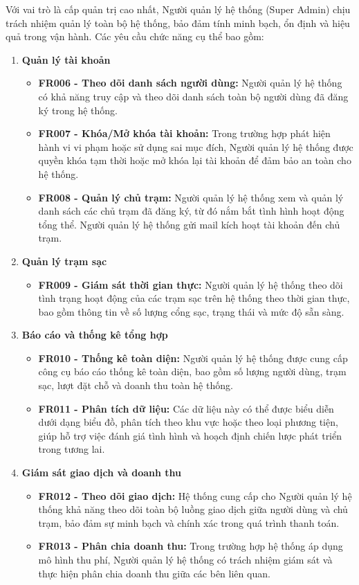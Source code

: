 Với vai trò là cấp quản trị cao nhất, Người quản lý hệ thống (Super Admin) chịu trách nhiệm quản lý toàn bộ hệ thống, bảo đảm tính minh bạch, ổn định và hiệu quả trong vận hành. Các yêu cầu chức năng cụ thể bao gồm:
\begin{enumerate}[label=\textbf{\alph*)}]
 \item \textbf{Quản lý tài khoản}
 \begin{itemize}
    \item \textbf{FR006 - Theo dõi danh sách người dùng:} Người quản lý hệ thống có khả năng truy cập và theo dõi danh sách toàn bộ người dùng đã đăng ký trong hệ thống.
    \item \textbf{FR007 - Khóa/Mở khóa tài khoản:} Trong trường hợp phát hiện hành vi vi phạm hoặc sử dụng sai mục đích, Người quản lý hệ thống được quyền khóa tạm thời hoặc mở khóa lại tài khoản để đảm bảo an toàn cho hệ thống.
    \item \textbf{FR008 - Quản lý chủ trạm:} Người quản lý hệ thống xem và quản lý danh sách các chủ trạm đã đăng ký, từ đó nắm bắt tình hình hoạt động tổng thể. Người quản lý hệ thống gửi mail kích hoạt tài khoản đến chủ trạm.
 \end{itemize}
 \item \textbf{Quản lý trạm sạc}
 \begin{itemize}
    \item \textbf{FR009 - Giám sát thời gian thực:} Người quản lý hệ thống theo dõi tình trạng hoạt động của các trạm sạc trên hệ thống theo thời gian thực, bao gồm thông tin về số lượng cổng sạc, trạng thái và mức độ sẵn sàng.
 \end{itemize}
 \item \textbf{Báo cáo và thống kê tổng hợp}
 \begin{itemize}
    \item \textbf{FR010 - Thống kê toàn diện:} Người quản lý hệ thống được cung cấp công cụ báo cáo thống kê toàn diện, bao gồm số lượng người dùng, trạm sạc, lượt đặt chỗ và doanh thu toàn hệ thống.
    \item \textbf{FR011 - Phân tích dữ liệu:} Các dữ liệu này có thể được biểu diễn dưới dạng biểu đồ, phân tích theo khu vực hoặc theo loại phương tiện, giúp hỗ trợ việc đánh giá tình hình và hoạch định chiến lược phát triển trong tương lai.
 \end{itemize}  
 \item \textbf{Giám sát giao dịch và doanh thu}
 \begin{itemize}
    \item \textbf{FR012 - Theo dõi giao dịch:} Hệ thống cung cấp cho Người quản lý hệ thống khả năng theo dõi toàn bộ luồng giao dịch giữa người dùng và chủ trạm, bảo đảm sự minh bạch và chính xác trong quá trình thanh toán.
    \item \textbf{FR013 - Phân chia doanh thu:} Trong trường hợp hệ thống áp dụng mô hình thu phí, Người quản lý hệ thống có trách nhiệm giám sát và thực hiện phân chia doanh thu giữa các bên liên quan.
 \end{itemize}
\end{enumerate}

